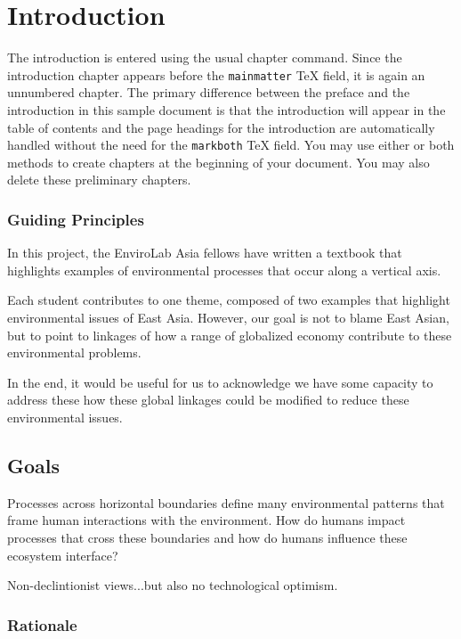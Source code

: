 \chapter{Introduction}

The introduction is entered using the usual chapter command. Since
the introduction chapter appears before the \verb|mainmatter| TeX
field, it is again an unnumbered chapter. The primary difference
between the preface and the introduction in this sample document
is that the introduction will appear in the table of contents and
the page headings for the introduction are automatically handled
without the need for the \verb|markboth| TeX field. You may use
either or both methods to create chapters at the beginning of your
document. You may also delete these preliminary chapters.

\subsection{Guiding Principles}

In this project, the EnviroLab Asia fellows have written a textbook that highlights examples of environmental processes that occur along a vertical axis. 

Each student contributes to one theme, composed of two examples that highlight environmental issues of East Asia. However, our goal is not to blame East Asian, but to point to linkages of how a range of globalized economy contribute to these environmental problems. 

In the end, it would be useful for us to acknowledge we have some capacity to address these how these global linkages could be modified to reduce these environmental issues. 

\section{Goals}

Processes across horizontal boundaries define many environmental patterns that frame human interactions with the environment. How do humans impact processes that cross these boundaries and how do humans influence these ecosystem interface?

Non-declintionist views...but also no technological optimism. 

\subsection{Rationale}


